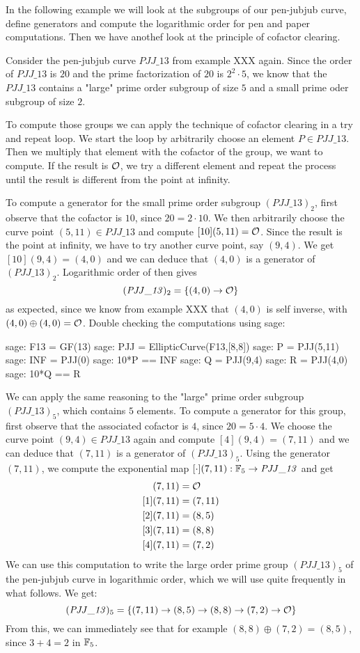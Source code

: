 In the following example we will look at the subgroups of our pen-jubjub curve, define generators and compute the logarithmic order for pen and paper computations. Then we have anothef look at the principle of cofactor clearing.
\begin{example} Consider the pen-jubjub curve $\mathit{PJJ\_13}$ from example XXX again. Since the order of $\mathit{PJJ\_13}$ is $20$ and the prime factorization of $20$ is $2^2\cdot 5$, we know that the $\mathit{PJJ\_13}$ contains a "large" prime order subgroup of size $5$ and a small prime oder subgroup of size $2$.

To compute those groups we can apply the technique of cofactor clearing in a try and repeat loop. We start the loop by arbitrarily choose an element $P\in \mathit{PJJ\_13}$. Then we multiply that element with the cofactor of the group, we want to compute. If the result is $\mathcal{O}$, we try a different element and repeat the process until the result is different from the point at infinity.

To compute a generator for the small prime order subgroup $(\mathit{PJJ\_13})_2$, first observe that the cofactor is $10$, since $20=2\cdot 10$. We then arbitrarily choose the curve point $(5,11)\in \mathit{PJJ\_13}$ and compute $[10](5,11)=\mathcal{O}$. Since the result is the point at infinity, we have to try another curve point, say $(9,4)$. We get $[10](9,4)=(4,0)$ and we can deduce that $(4,0)$ is a generator of $(\mathit{PJJ\_13})_2$. Logarithmic order of then gives
$$
(\mathit{PJJ\_13})_2 = \{(4,0)\to \mathcal{O}\}
$$
as expected, since we know from example XXX that $(4,0)$ is self inverse, with $(4,0)\oplus (4,0)=\mathcal{O}$. Double checking the computations using sage:
\begin{sagecommandline}
sage: F13 = GF(13)
sage: PJJ = EllipticCurve(F13,[8,8])
sage: P = PJJ(5,11)
sage: INF = PJJ(0)
sage: 10*P == INF
sage: Q = PJJ(9,4)
sage: R = PJJ(4,0)
sage: 10*Q == R
\end{sagecommandline}
We can apply the same reasoning to the "large" prime order subgroup $(\mathit{PJJ\_13})_5$, which contains $5$ elements. To compute a generator for this group, first observe that the associated cofactor is $4$, since $20=5\cdot 4$. We choose the curve point $(9,4)\in \mathit{PJJ\_13}$ again and compute $[4](9,4)=(7,11)$ and we can deduce that $(7,11)$ is a generator of $(\mathit{PJJ\_13})_5$. Using the generator $(7,11)$, we compute the exponential map $[\cdot](7,11): \mathbb{F}_5 \to \mathit{PJJ\_13}$ and get
\begin{align*}
[0](7,11) &= \Oinf\\
[1](7,11) &= (7,11)\\
[2](7,11) &= (8,5)\\
[3](7,11) &= (8,8)\\
[4](7,11) &= (7,2)
\end{align*}
We can use this computation to write the large order prime group $(\mathit{PJJ\_13})_5$ of the pen-jubjub curve in logarithmic order, which we will use quite frequently in what follows. We get:
$$
(\mathit{PJJ\_13})_5 = \{(7,11)\to(8,5)\to(8,8)\to(7,2)\to \mathcal{O}\}
$$
From this, we can immediately see that for example $(8,8)\oplus (7,2)= (8,5)$, since
$3+4=2$ in $\mathbb{F}_5$.
\end{example}
